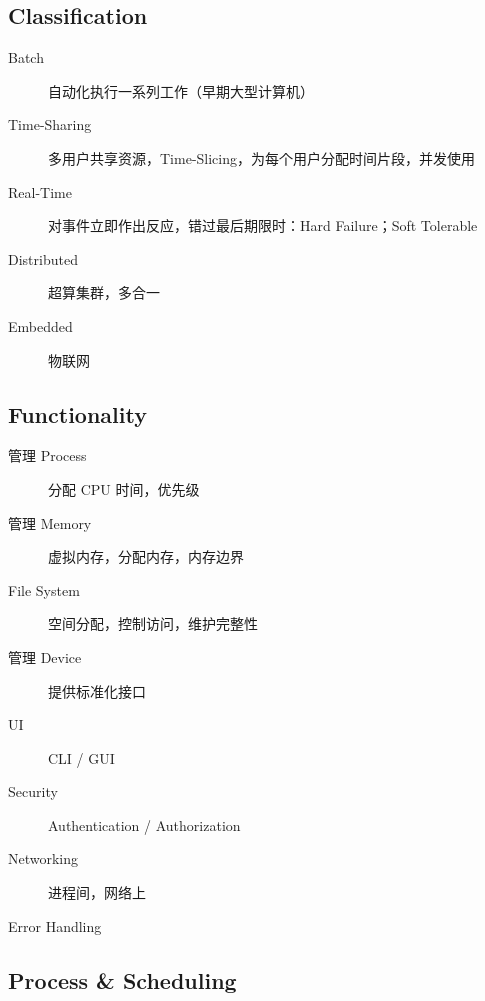 \documentclass[11pt,journal,compsoc]{IEEEtran}
\begin{document}
\subsection{Classification}

\begin{description}
    \item[Batch] 自动化执行一系列工作（早期大型计算机）

    \item[Time-Sharing] 多用户共享资源，Time-Slicing，为每个用户分配时间片段，并发使用

    \item[Real-Time] 对事件立即作出反应，错过最后期限时：Hard Failure；Soft Tolerable

    \item[Distributed] 超算集群，多合一

    \item[Embedded] 物联网
\end{description}


\subsection{Functionality}

\begin{description}
    \item[管理 Process] 分配 CPU 时间，优先级

    \item[管理 Memory] 虚拟内存，分配内存，内存边界

    \item[File System] 空间分配，控制访问，维护完整性

    \item[管理 Device] 提供标准化接口

    \item[UI] CLI / GUI

    \item[Security] Authentication / Authorization

    \item[Networking] 进程间，网络上

    \item[Error Handling]
\end{description}


\subsection{Process \& Scheduling}
\end{document}
